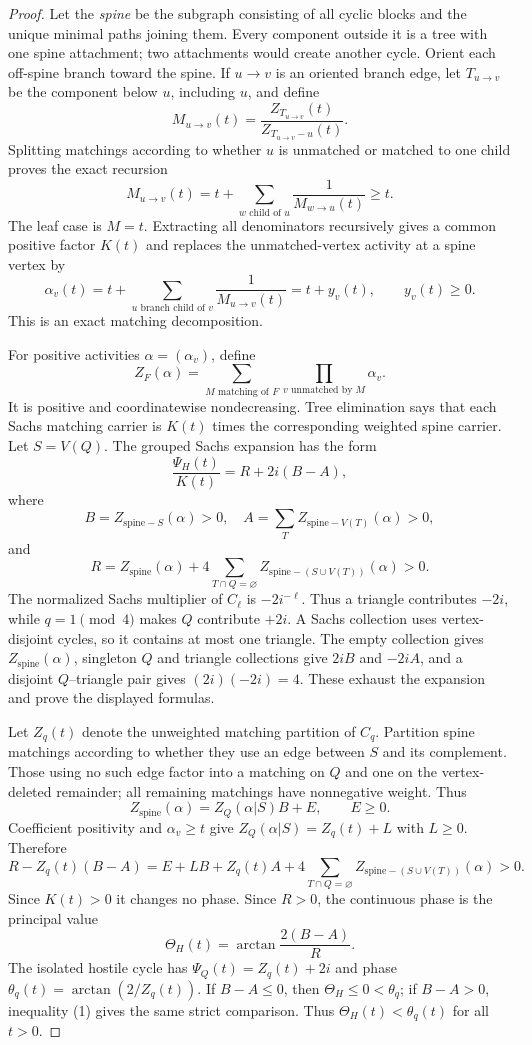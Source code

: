 \documentclass[11pt]{article}
\theoremstyle{remark}
\begin{document}
\begin{proof}
Let the \emph{spine} be the subgraph consisting of all cyclic blocks and the
unique minimal paths joining them.  Every component outside it is a tree with
one spine attachment; two attachments would create another cycle.  Orient each
off-spine branch toward the spine.  If $u\to v$ is an oriented branch edge,
let $T_{u\to v}$ be the component below $u$, including $u$, and define
\[
 M_{u\to v}(t)=\frac{Z_{T_{u\to v}}(t)}
                       {Z_{T_{u\to v}-u}(t)}.
\]
Splitting matchings according to whether $u$ is unmatched or matched to one
child proves the exact recursion
\[
 M_{u\to v}(t)=t+\sum_{w\text{ child of }u}
                   \frac1{M_{w\to u}(t)}\geq t.                 \tag{1}
\]
The leaf case is $M=t$.  Extracting all denominators recursively gives a
common positive factor $K(t)$ and replaces the unmatched-vertex activity at a
spine vertex by
\[
 \alpha_v(t)=t+\sum_{u\text{ branch child of }v}
                    \frac1{M_{u\to v}(t)}=t+y_v(t),
 \qquad y_v(t)\geq0.                                           \tag{2}
\]
This is an exact matching decomposition.

For positive activities $\alpha=(\alpha_v)$, define
\[
 Z_F(\alpha)=\sum_{M\text{ matching of }F}
                  \prod_{v\text{ unmatched by }M}\alpha_v.
\]
It is positive and coordinatewise nondecreasing.  Tree elimination says that
each Sachs matching carrier is $K(t)$ times the corresponding weighted spine
carrier.  Let $S=V(Q)$.
The grouped Sachs expansion has the form
\[
 \frac{\Psi_H(t)}{K(t)}=R+2i(B-A),
\]
where
\[
 B=Z_{\mathrm{spine}-S}(\alpha)>0,
 \quad
 A=\sum_T Z_{\mathrm{spine}-V(T)}(\alpha)>0,
\]
and
\[
 R=Z_{\mathrm{spine}}(\alpha)
   +4\sum_{T\cap Q=\varnothing}
       Z_{\mathrm{spine}-(S\cup V(T))}(\alpha)>0.
\]
The normalized Sachs multiplier of $C_\ell$ is $-2i^{-\ell}$.  Thus a triangle
contributes $-2i$, while $q=1\pmod4$ makes $Q$ contribute $+2i$.  A Sachs
collection uses vertex-disjoint cycles, so it contains at most one triangle.
The empty collection gives $Z_{\mathrm{spine}}(\alpha)$, singleton $Q$ and
triangle collections give $2iB$ and $-2iA$, and a disjoint $Q$--triangle pair
gives $(2i)(-2i)=4$.  These exhaust the expansion and prove the displayed
formulas.

Let $Z_q(t)$ denote the unweighted matching partition of $C_q$.  Partition
spine matchings according to whether they use an edge between $S$ and its
complement.  Those using no such edge factor into a matching on $Q$ and one on
the vertex-deleted remainder; all remaining matchings have nonnegative weight.
Thus
\[
 Z_{\mathrm{spine}}(\alpha)=Z_Q(\alpha|S)B+E,
 \qquad E\geq0.
\]
Coefficient positivity and $\alpha_v\geq t$ give
$Z_Q(\alpha|S)=Z_q(t)+L$ with $L\geq0$.  Therefore
\[
 R-Z_q(t)(B-A)
 =E+LB+Z_q(t)A
 +4\sum_{T\cap Q=\varnothing}
   Z_{\mathrm{spine}-(S\cup V(T))}(\alpha)>0.             \tag{1}
\]
Since $K(t)>0$ it changes no phase.  Since $R>0$, the continuous phase is the
principal value
\[
 \Theta_H(t)=\arctan\frac{2(B-A)}R.
\]
The isolated hostile cycle has
$\Psi_Q(t)=Z_q(t)+2i$ and phase
$\theta_q(t)=\arctan(2/Z_q(t))$.  If $B-A\leq0$, then
$\Theta_H\leq0<\theta_q$; if $B-A>0$, inequality (1) gives the same strict
comparison.  Thus $\Theta_H(t)<\theta_q(t)$ for all $t>0$.


\end{proof}
\end{document}

